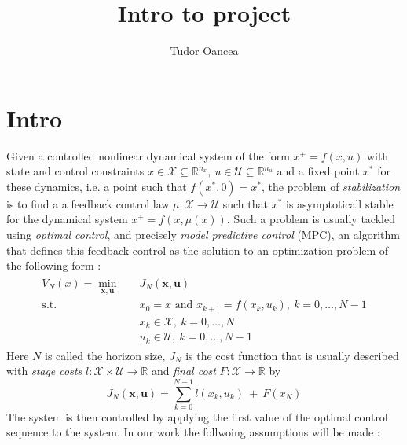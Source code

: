 \documentclass[12pt]{article}
\title{Intro to project}
\author{Tudor Oancea}
\date{}
\theoremstyle{definition}
\theoremstyle{remark}
\def\cal#1{\mathcal{#1}}
\newcommand{\R}{\mathbb{R}}
\begin{document}
\maketitle

\section{Intro}
Given a controlled nonlinear dynamical system of the form $x^+=f(x,u)$ with state and control constraints $x\in\cal{X}\subseteq\R^{n_x},~u\in\cal{U}\subseteq\R^{n_u}$ and a fixed point $x^*$ for these dynamics, i.e. a point such that $f(x^*,0)=x^*$, the problem of \textit{stabilization} is to find a a feedback control law $\mu:\cal{X}\to\cal{U}$ such that $x^*$ is asymptoticall stable for the dynamical system $x^+=f(x,\mu(x))$.
Such a problem is usually tackled using \textit{optimal control}, and precisely \textit{model predictive control} (MPC), an algorithm that defines this feedback control as the solution to an optimization problem of the following form :
\begin{align}
	\begin{split}
		\label{NMPC}
		V_N(x)=\underset{\mathbf{x},\mathbf{u}}{\min} &\quad J_N(\mathbf{x},\mathbf{u})\\
		\text{s.t.} &\quad x_0=x\text{ and }x_{k+1}=f(x_k,u_k),~k=0,\dots,N-1\\
		&\quad x_k\in\cal{X},~k=0,\dots,N\\
		&\quad u_k\in\cal{U},~k=0,\dots,N-1
	\end{split}
\end{align}
Here $N$ is called the horizon size, $J_N$ is the cost function that is usually described with \textit{stage costs} $l:\cal{X}\times\cal{U}\to\R$ and \textit{final cost} $F:\cal{X}\to\R$ by 
$$J_N(\mathbf{x},\mathbf{u})=\sum_{k=0}^{N-1}l(x_k,u_k)~+~F(x_N)$$
The system is then controlled by applying the first value of the optimal control sequence to the system.\newline
In our work the follwoing assumptions will be made :
\end{document}
